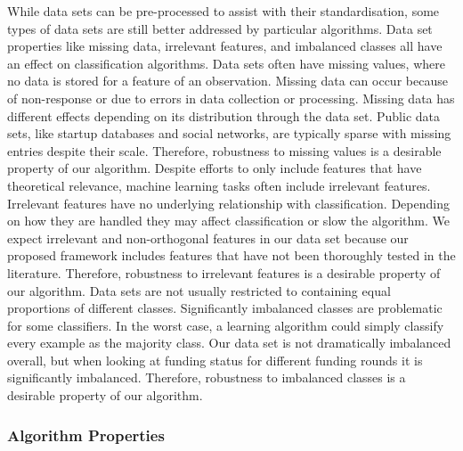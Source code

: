 \documentclass[../thesis/thesis.tex]{subfiles}
\begin{document}
While data sets can be pre-processed to assist with their standardisation, some types of data sets are still better addressed by particular algorithms. Data set properties like missing data, irrelevant features, and imbalanced classes all have an effect on classification algorithms. Data sets often have missing values, where no data is stored for a feature of an observation. Missing data can occur because of non-response or due to errors in data collection or processing. Missing data has different effects depending on its distribution through the data set. Public data sets, like startup databases and social networks, are typically sparse with missing entries despite their scale. Therefore, robustness to missing values is a desirable property of our algorithm. Despite efforts to only include features that have theoretical relevance, machine learning tasks often include irrelevant features. Irrelevant features have no underlying relationship with classification. Depending on how they are handled they may affect classification or slow the algorithm. We expect irrelevant and non-orthogonal features in our data set because our proposed framework includes features that have not been thoroughly tested in the literature. Therefore, robustness to irrelevant features is a desirable property of our algorithm. Data sets are not usually restricted to containing equal proportions of different classes. Significantly imbalanced classes are problematic for some classifiers. In the worst case, a learning algorithm could simply classify every example as the majority class. Our data set is not dramatically imbalanced overall, but when looking at funding status for different funding rounds it is significantly imbalanced. Therefore, robustness to imbalanced classes is a desirable property of our algorithm.

\subsubsection{Algorithm Properties}
\end{document}
